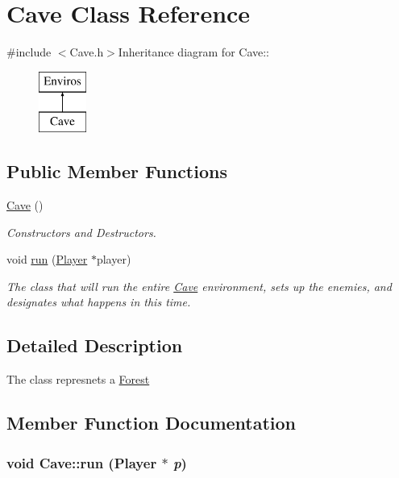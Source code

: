 \hypertarget{classCave}{
\section{Cave Class Reference}
\label{classCave}
}


{\ttfamily \#include $<$Cave.h$>$}Inheritance diagram for Cave::\begin{figure}[H]
\begin{center}
\leavevmode
\includegraphics[height=2cm]{classCave}
\end{center}
\end{figure}
\subsection*{Public Member Functions}
\begin{DoxyCompactItemize}
\item 
\hypertarget{classCave_a3521990d4fcc6d69e70e31f0c74bef12}{
\hyperlink{classCave_a3521990d4fcc6d69e70e31f0c74bef12}{Cave} ()}
\label{classCave_a3521990d4fcc6d69e70e31f0c74bef12}

\begin{DoxyCompactList}\small\item\em Constructors and Destructors. \item\end{DoxyCompactList}\item 
void \hyperlink{classCave_a64da68a2408b66f8222f087e600bbdcf}{run} (\hyperlink{classPlayer}{Player} $\ast$player)
\begin{DoxyCompactList}\small\item\em The class that will run the entire \hyperlink{classCave}{Cave} environment, sets up the enemies, and designates what happens in this time. \item\end{DoxyCompactList}\end{DoxyCompactItemize}


\subsection{Detailed Description}
The class represnets a \hyperlink{classForest}{Forest} 

\subsection{Member Function Documentation}
\hypertarget{classCave_a64da68a2408b66f8222f087e600bbdcf}{
\subsubsection[{run}]{\setlength{\rightskip}{0pt plus 5cm}void Cave::run ({\bf Player} $\ast$ {\em p})}}
\label{classCave_a64da68a2408b66f8222f087e600bbdcf}


